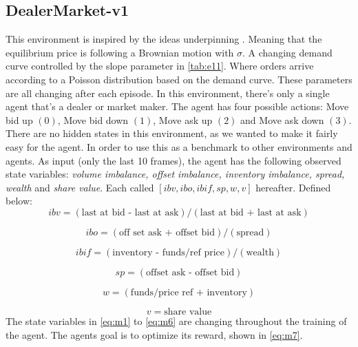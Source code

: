 \documentclass{kththesis}
\theoremstyle{definition}
\begin{document}
\subsection{DealerMarket-v1}
This environment is inspired by the ideas underpinning \textcite{ho1981optimal}. Meaning that the equilibrium price is following a Brownian motion with $\sigma$.  A changing demand curve controlled by the slope parameter in \autoref{tab:e11}. Where orders arrive according to a Poisson distribution based on the demand curve. These parameters are all changing after each episode.  
\newline
\newline
In this environment, there's only a single agent that's a dealer or market maker. The agent has four possible actions: Move bid up $(0)$, Move bid down $(1)$, Move ask up $(2)$ and Move ask down $(3)$. There are no hidden states in this environment, as we wanted to make it fairly easy for the agent. In order to use this as a benchmark to other environments and agents. 
\newline
\newline
As input (only the last 10 frames), the agent has the following observed state variables: \textit{volume imbalance, offset imbalance, inventory imbalance, spread, wealth} and \textit{share value}. 
Each called $[ibv, ibo, ibif,sp, w,v]$ hereafter. Defined below:
\begin{equation}
\label{eq:m1}
    ibv = (\text{last at bid - last at ask})/(\text{last at bid + last at ask})
\end{equation}

\begin{equation}
\label{eq:m2}
    ibo = (\text{off set ask + offset bid})/(\text{spread})
\end{equation}

\begin{equation}
\label{eq:m3}
    ibif = (\text{inventory - funds/ref price})/(\text{wealth})
\end{equation}

\begin{equation}
\label{eq:m4}
    sp = (\text{offset ask - offset bid})
\end{equation}

\begin{equation}
\label{eq:m5}
    w = (\text{funds/price ref + inventory})
\end{equation}

\begin{equation}
\label{eq:m6}
    v = \text{share value}
\end{equation}
The state variables in \autoref{eq:m1} to \autoref{eq:m6} are changing throughout the training of the agent. The agents goal is to optimize its reward, shown in \autoref{eq:m7}. 
\end{document}

